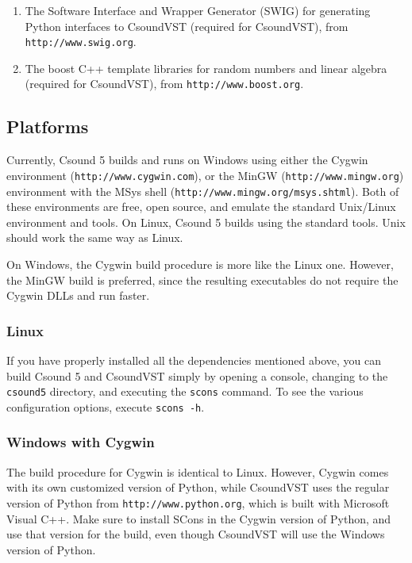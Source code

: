 \documentclass[10pt,letterpaper,onecolumn]{ltxguide}
\begin{document}
\begin{enumerate}
\item The Software Interface and Wrapper Generator (SWIG) for generating Python interfaces to CsoundVST (required for CsoundVST), from \linebreak[3] \texttt{http://www.swig.org}.
\item The boost C++ template libraries for random numbers and linear algebra (required for CsoundVST), from \linebreak[4] \texttt{http://www.boost.org}.
\end{enumerate}

\subsection{Platforms}

Currently, Csound 5 builds and runs on Windows using either the Cygwin environment (\texttt{http://www.cygwin.com}), or the MinGW \linebreak[4] (\texttt{http://www.mingw.org}) environment with the MSys shell \linebreak[4] (\texttt{http://www.mingw.org/msys.shtml}). Both of these environments are free, open source, and emulate the standard Unix/Linux environment and tools. On Linux, Csound 5 builds using the standard tools. Unix should work the same way as Linux.

On Windows, the Cygwin build procedure is more like the Linux one. However, the MinGW build is preferred, since the resulting executables do not require the Cygwin DLLs and run faster.

\subsubsection{Linux}

If you have properly installed all the dependencies mentioned above, you can build Csound 5 and CsoundVST simply by opening a console, changing to the \texttt{csound5} directory, and executing the \texttt{scons} command. To see the various configuration options, execute \texttt{scons -h}.

\subsubsection{Windows with Cygwin}

The build procedure for Cygwin is identical to Linux. However, Cygwin comes with its own customized version of Python, while CsoundVST uses the regular version of Python from \texttt{http://www.python.org}, which is built with Microsoft Visual C++. Make sure to install SCons in the Cygwin version of Python, and use that version for the build, even though CsoundVST will use the Windows version of Python.
\end{document}
